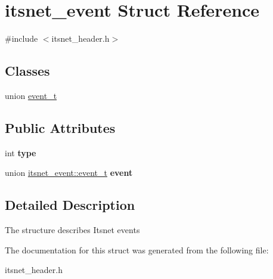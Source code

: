 \hypertarget{structitsnet__event}{\section{itsnet\-\_\-event \-Struct \-Reference}
\label{structitsnet__event}
}


{\ttfamily \#include $<$itsnet\-\_\-header.\-h$>$}

\subsection*{\-Classes}
\begin{DoxyCompactItemize}
\item 
union \hyperlink{unionitsnet__event_1_1event__t}{event\-\_\-t}
\end{DoxyCompactItemize}
\subsection*{\-Public \-Attributes}
\begin{DoxyCompactItemize}
\item 
\hypertarget{structitsnet__event_a68a18348804754b129b4607ca88dcf0d}{int {\bfseries type}}\label{structitsnet__event_a68a18348804754b129b4607ca88dcf0d}

\item 
\hypertarget{structitsnet__event_a1b1044296f9b76144f165208aa64bb77}{union \hyperlink{unionitsnet__event_1_1event__t}{itsnet\-\_\-event\-::event\-\_\-t} {\bfseries event}}\label{structitsnet__event_a1b1044296f9b76144f165208aa64bb77}

\end{DoxyCompactItemize}


\subsection{\-Detailed \-Description}
\-The structure describes \-Itsnet events 

\-The documentation for this struct was generated from the following file\-:\begin{DoxyCompactItemize}
\item 
itsnet\-\_\-header.\-h\end{DoxyCompactItemize}
